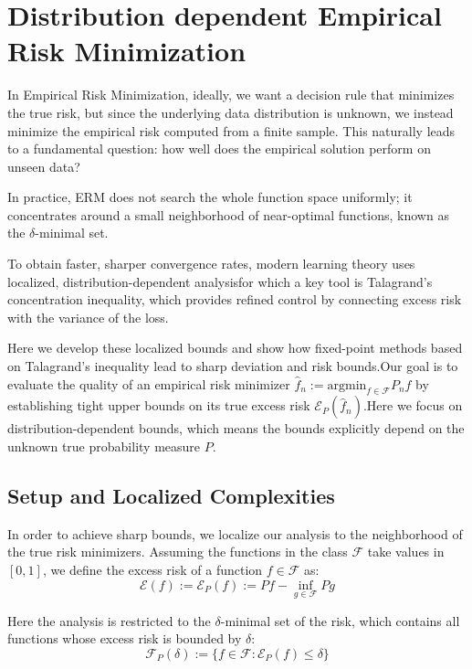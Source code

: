 \section{Distribution dependent Empirical Risk Minimization}\label{sec:distr_ERM}

In Empirical Risk Minimization, ideally, we want a decision rule that minimizes the true risk, but since the underlying data distribution is unknown, we instead minimize the empirical risk computed from a finite sample. This naturally leads to a fundamental question: how well does the empirical solution perform on unseen data?

In practice, ERM does not search the whole function space uniformly; it concentrates around a small neighborhood of near-optimal functions, known as the $\delta$-minimal set.

To obtain faster, sharper convergence rates, modern learning theory uses localized, distribution-dependent analysisfor which a key tool is Talagrand's concentration inequality, which provides refined control by connecting excess risk with the variance of the loss.

Here we develop these localized bounds and show how fixed-point methods based on Talagrand's inequality lead to sharp deviation and risk bounds.Our goal is to evaluate the quality of an empirical risk minimizer $\hat{f}_n := \text{argmin}_{f\in\mathcal{F}} P_n f$ by establishing tight upper bounds on its true excess risk $\mathcal{E}_P(\hat{f}_n)$.Here we focus on distribution-dependent bounds, which means the bounds explicitly depend on the unknown true probability measure $P$.

\subsection{Setup and Localized Complexities}
In order to achieve sharp bounds, we localize our analysis to the neighborhood of the true risk minimizers. Assuming the functions in the class $\mathcal{F}$ take values in $[0, 1]$, we define the excess risk of a function $f \in \mathcal{F}$ as:
\begin{equation}
  \mathcal{E}(f) := \mathcal{E}_P(f) := Pf - \inf_{g\in\mathcal{F}} Pg
\end{equation}

Here the analysis is restricted to the $\delta$-minimal set of the risk, which contains all functions whose excess risk is bounded by $\delta$:
\begin{equation}
  \mathcal{F}_P(\delta) := \{f \in \mathcal{F} : \mathcal{E}_P(f) \le \delta\}
\end{equation}

